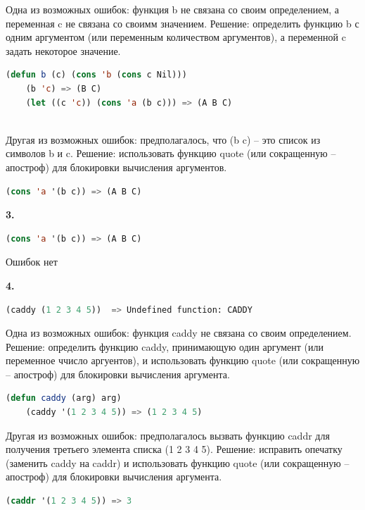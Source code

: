 \documentclass[12pt]{report}
\begin{document}
Одна из возможных ошибок: функция b не связана со своим определением, а переменная c не связана со своимм значением. Решение: определить функцию b с одним аргументом (или переменным количеством аргументов), а переменной c задать некоторое значение.
\begin{lstlisting}[language=Lisp]
	(defun b (c) (cons 'b (cons c Nil)))
	(b 'c) => (B C)
	(let ((c 'c)) (cons 'a (b c))) => (A B C)
	
\end{lstlisting}

Другая из возможных ошибок: предполагалось, что (b c) -- это список из символов b и c. Решение: использовать функцию quote (или сокращенную -- апостроф) для блокировки вычисления аргументов.
\begin{lstlisting}[language=Lisp]
	(cons 'a '(b c)) => (A B C)
\end{lstlisting}






\textbf{3.} 
\begin{lstlisting}[language=Lisp]
	(cons 'a '(b c)) => (A B C)
\end{lstlisting}
Ошибок нет





\textbf{4.} 

\begin{lstlisting}[language=Lisp]
	(caddy (1 2 3 4 5))  => Undefined function: CADDY
\end{lstlisting}

Одна из возможных ошибок: функция caddy не связана со своим определением. Решение: определить функцию caddy, принимающую один аргумент  (или переменное ччисло аргуентов), и использовать функцию quote (или сокращенную -- апостроф) для блокировки вычисления аргумента.
\begin{lstlisting}[language=Lisp]
	(defun caddy (arg) arg)
	(caddy '(1 2 3 4 5)) => (1 2 3 4 5)
\end{lstlisting}

Другая из возможных ошибок: предполагалось вызвать функцию caddr для получения третьего элемента списка (1 2 3 4 5). Решение: исправить опечатку (заменить caddy на caddr) и использовать функцию quote (или сокращенную -- апостроф) для блокировки вычисления аргумента.
\begin{lstlisting}[language=Lisp]
	(caddr '(1 2 3 4 5)) => 3
\end{lstlisting}
\end{document}
